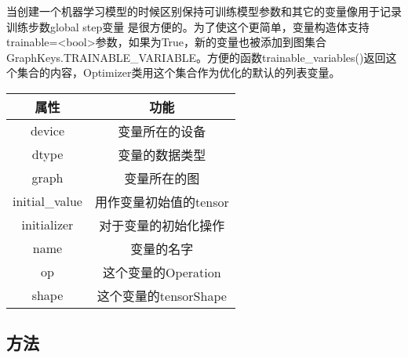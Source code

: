 当创建一个机器学习模型的时候区别保持可训练模型参数和其它的变量像用于记录训练步数global step变量 是很方便的。为了使这个更简单，变量构造体支持trainable=<bool>参数，如果为True，新的变量也被添加到图集合GraphKeys.TRAINABLE\_VARIABLE。方便的函数trainable\_variables()返回这个集合的内容，Optimizer类用这个集合作为优化的默认的列表变量。
\begin{center}
\begin{tabular}{|c|c|}
\hline
属性&功能\\
\hline
device&变量所在的设备\\
\hline
dtype&变量的数据类型\\
\hline
graph&变量所在的图\\
\hline
initial\_value&用作变量初始值的tensor\\
\hline
initializer&对于变量的初始化操作\\
\hline
name&变量的名字\\
\hline
op&这个变量的Operation\\
\hline
shape&这个变量的tensorShape\\
\hline
\end{tabular}
\end{center}
\subsection{方法}
